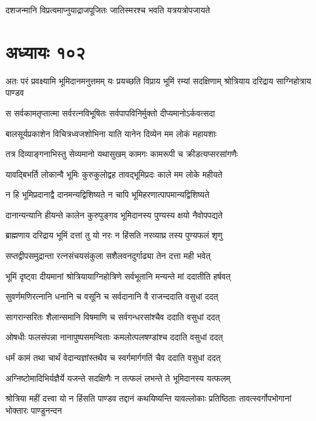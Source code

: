 \twolineshloka
{दशजन्मानि विप्रत्वमाप्नुयाद्राजपूजितः}
{जातिस्मरश्च भवति यत्रयत्रोपजायते}


\chapter{अध्यायः १०२}
अतः परं प्रवक्ष्यामि भूमिदानमनुत्तमम्
\twolineshloka
{यः प्रयच्छति विप्राय भूमिं रम्यां सदक्षिणाम्}
{श्रोत्रियाय दरिद्राय साग्निहोत्राय पाण्डव}


\twolineshloka
{स सर्वकामतृप्तात्मा सर्वरत्नविभूषितः}
{सर्वपापविनिर्मुक्तो दीप्यमानोऽर्कवत्सदा}


\twolineshloka
{बालसूर्यप्रकाशेन विचित्रध्वजशोभिना}
{याति यानेन दिव्येन मम लोकं महायशाः}


\twolineshloka
{तत्र दिव्याङ्गनाभिस्तु सेव्यमानो यथासुखम्}
{कामगः कामरूपी च क्रीडत्यप्सरसांगणैः}


\twolineshloka
{यावद्बिभर्ति लोकान्वै भूमिः कुरुकुलोद्वह}
{तावद्भूमिप्रदः काले मम लोके महीयते}


\twolineshloka
{न हि भूमिप्रदानाद्वै दानमन्यद्विशिष्यते}
{न चापि भूमिहरणात्पापमान्यद्विशिष्यते}


\twolineshloka
{दानान्यन्यानि हीयन्ते कालेन कुरुपुङ्गव}
{भूमिदानस्य पुण्यस्य क्षयो नैवोपपद्यते}


\twolineshloka
{ब्राह्मणाय दरिद्राय भूमिं दत्तां तु यो नरः}
{न हिंसति नरव्याघ्र तस्य पुण्यफलं शृणु}


\twolineshloka
{सप्तद्वीपसमुद्रान्ता रत्नसंचयसंकुला}
{सशैलवनदुर्गाढ्या तेन दत्ता मही भवेत्}


\twolineshloka
{भूमिं दृष्ट्वा दीयमानां श्रोत्रियायाग्निहोत्रिणे}
{सर्वभूतानि मन्यन्ते मां ददातीति हर्षवत्}


\twolineshloka
{सुवर्णमणिरत्नानि धनानि च वसूनि च}
{सर्वदानानि वै राजन्ददाति वसुधां ददत्}


\twolineshloka
{सागरान्सरितः शैलान्समानि विषमाणि च}
{सर्वगन्धरसांश्चैव ददाति वसुधां ददत्}


\twolineshloka
{ओषधीः फलसंपन्ना नानापुष्पसमन्विताः}
{कमलोत्पलषण्डांश्च ददाति वसुधां ददत्}


\twolineshloka
{धर्मं कामं तथा चार्थं वेदान्यज्ञांस्तथैव च}
{स्वर्गमार्गगतिं चैव ददाति वसुधां ददत्}


\twolineshloka
{अग्निष्टोमादिभिर्यज्ञैर्ये यजन्ते सदक्षिणैः}
{न तत्फलं लभन्ते ते भूमिदानस्य यत्फलम्}


\threelineshloka
{श्रोत्रिया महीं दत्त्वा यो न हिंसति पाण्डव}
{तद्दानं कथयिष्यन्ति यावल्लोकाः प्रतिष्ठिताः}
{तावत्स्वर्गोपभोगानां भोक्तारः पाण्डुनन्दन}


